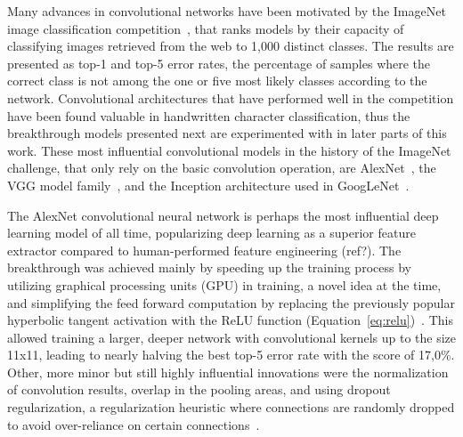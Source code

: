 \documentclass[english,twoside,openright]{UH_DS_MSc}
\begin{document}
Many advances in convolutional networks have been motivated by the ImageNet image classification competition~\cite{imagenet},
 that ranks models by their capacity of classifying images retrieved from the web to 1,000 distinct classes.
 The results are presented as top-1 and top-5 error rates, the percentage of samples 
where the correct class is not among the one or five most likely classes according to the network. Convolutional architectures
that have performed well in the competition have been found valuable in handwritten character classification, thus the 
breakthrough models presented next are experimented with in later parts of this work.
These most influential convolutional models in the history of the ImageNet challenge,  that
only rely on the basic convolution operation, are AlexNet~\cite{alexnet}, 
the VGG model family~\cite{vgg}, and
the Inception architecture used in GoogLeNet~\cite{googlelenet}.

The AlexNet convolutional neural network is perhaps the most influential deep learning model of all time, 
popularizing deep learning as a superior feature extractor compared to human-performed feature engineering (ref?).
The breakthrough was achieved mainly by speeding up the training process by utilizing graphical processing units (GPU)
in training, a novel idea at the time, and simplifying the feed forward computation by replacing the previously popular 
hyperbolic tangent activation with the ReLU function (Equation~\ref{eq:relu})~\cite{alexnet}.
 This allowed training a larger, deeper network
with convolutional kernels up to the size 11x11, leading to nearly halving the best top-5 error rate with the score of
17,0\%. Other, more minor but still highly influential innovations were the normalization of convolution results, 
overlap in the pooling areas, and using dropout regularization, a regularization heuristic where connections are 
randomly dropped to avoid over-reliance on certain connections~\cite{dropout}.
\end{document}
